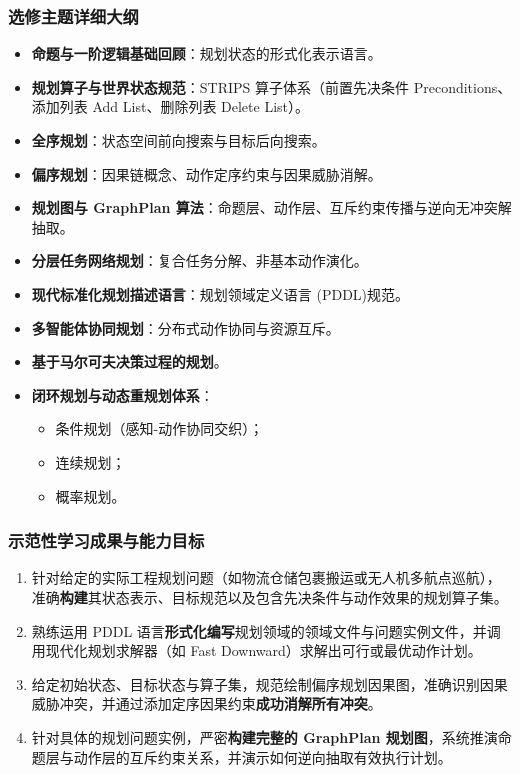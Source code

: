 \subsubsection{选修主题详细大纲}
\begin{itemize}
    \item \textbf{命题与一阶逻辑基础回顾}：规划状态的形式化表示语言。
    \item \textbf{规划算子与世界状态规范}：STRIPS 算子体系（前置先决条件 Preconditions、添加列表 Add List、删除列表 Delete List）。
    \item \textbf{全序规划}：状态空间前向搜索与目标后向搜索。
    \item \textbf{偏序规划}：因果链概念、动作定序约束与因果威胁消解。
    \item \textbf{规划图与 GraphPlan 算法}：命题层、动作层、互斥约束传播与逆向无冲突解抽取。
    \item \textbf{分层任务网络规划}：复合任务分解、非基本动作演化。
    \item \textbf{现代标准化规划描述语言}：规划领域定义语言 (PDDL)规范。
    \item \textbf{多智能体协同规划}：分布式动作协同与资源互斥。
    \item \textbf{基于马尔可夫决策过程的规划}。
    \item \textbf{闭环规划与动态重规划体系}：
    \begin{itemize}
        \item 条件规划（感知-动作协同交织）；
        \item 连续规划；
        \item 概率规划。
    \end{itemize}
\end{itemize}

\subsubsection{示范性学习成果与能力目标}
\begin{enumerate}
    \item 针对给定的实际工程规划问题（如物流仓储包裹搬运或无人机多航点巡航），准确\textbf{构建}其状态表示、目标规范以及包含先决条件与动作效果的规划算子集。
    \item 熟练运用 PDDL 语言\textbf{形式化编写}规划领域的领域文件与问题实例文件，并调用现代化规划求解器（如 Fast Downward）求解出可行或最优动作计划。
    \item 给定初始状态、目标状态与算子集，规范绘制偏序规划因果图，准确识别因果威胁冲突，并通过添加定序因果约束\textbf{成功消解所有冲突}。
    \item 针对具体的规划问题实例，严密\textbf{构建完整的 GraphPlan 规划图}，系统推演命题层与动作层的互斥约束关系，并演示如何逆向抽取有效执行计划。
\end{enumerate}

